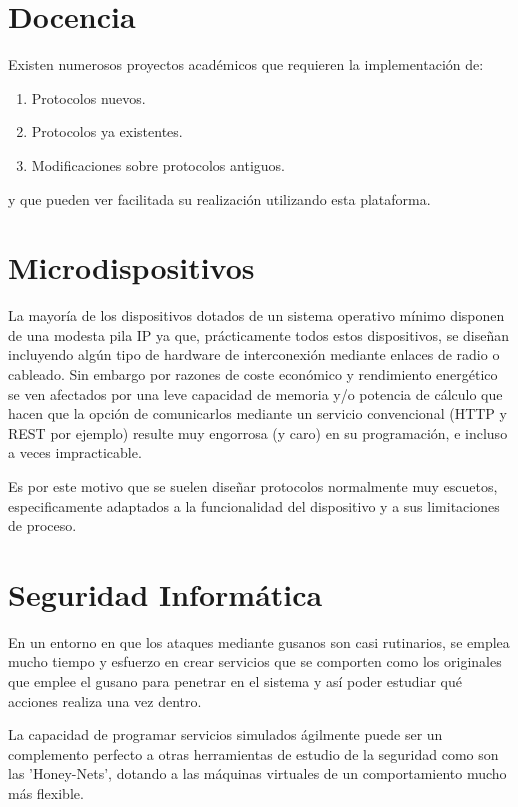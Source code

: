 \documentclass[a4paper,spanish,12pt]{book}
\begin{document}
\section{Docencia}
Existen numerosos proyectos acad\'emicos que requieren la implementaci\'on de:
\begin{enumerate}
	\item Protocolos nuevos.
	\item Protocolos ya existentes.
	\item Modificaciones sobre protocolos antiguos. 
\end{enumerate}

y que pueden ver facilitada su realización utilizando esta plataforma.

\section{Microdispositivos}
La mayor\'ia de los dispositivos dotados de un sistema operativo m\'inimo disponen de una modesta pila IP ya que, prácticamente todos estos dispositivos, se dise\~{n}an incluyendo algún tipo de hardware de interconexi\'on mediante enlaces de radio o cableado. Sin embargo por razones de coste económico y rendimiento energ\'etico se ven afectados por una leve capacidad de memoria y/o potencia de c\'alculo que hacen que la opción de comunicarlos mediante un servicio convencional (HTTP y REST por ejemplo) resulte muy engorrosa (y caro) en su programaci\'on, e incluso a veces impracticable.

Es por este motivo que se suelen dise\~{n}ar protocolos normalmente muy escuetos, especificamente adaptados a la funcionalidad del dispositivo y a sus limitaciones de proceso.

\section{Seguridad Inform\'atica}
En un entorno en que los ataques mediante gusanos son casi rutinarios, se emplea mucho tiempo y esfuerzo en crear servicios que se comporten como los originales que emplee el gusano para penetrar en el sistema y as\'i poder estudiar qué acciones realiza una vez dentro.

La capacidad de programar servicios simulados ágilmente puede ser un complemento perfecto a otras herramientas de estudio de la seguridad como son las 'Honey-Nets', dotando a las m\'aquinas virtuales de un comportamiento mucho m\'as flexible.
\end{document}
